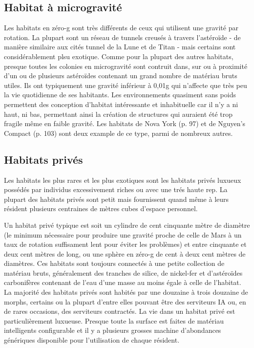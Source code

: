                \subsection{Habitat à microgravité} \label{sec:micr-habit} 

               Les habitats en zéro-g sont très différents de ceux qui utilisent une gravité par rotation. La plupart sont un réseau de tunnels creusés à travers l'astéroïde - de manière similaire aux cités tunnel de la Lune et de Titan - mais certains sont  considérablement plsu exotique. Comme pour la plupart des autres habitats, presque toutes les colonies en microgravité sont contruit dans, sur ou à proximité d'un ou de plusieurs astéroïdes contenant un grand nombre de matériau bruts utiles. Ils ont typiquement une gravité inférieur à 0,01g qui n'affecte que très peu la vie quotidienne de ses habitants. Les environnements quasiment sans poids permettent des conception d'habitat intéressante et inhabituelle car il n'y a ni haut, ni bas, permettant ainsi la création de structures qui auraient été trop fragile même en faible gravité. Les habitats de Nova York (p. 97) et de Nguyen's Compact (p. 103) sont deux example de ce type, parmi de nombreux autres. 

               \subsection{Habitats privés} \label{sec:private-habitats} 

               Les habitats les plus rares et les plus exotiques sont les habitats privés luxueux possédés par individus excessivement riches ou avec une trés haute rep. La plupart des habitats privés sont petit mais fournissent quand même à leurs résident plusieurs centraines de mètres cubes d'espace personnel. 

               Un habitat privé typique est soit un cylindre de cent cinquante mètre de diamètre (le minimum nécessaire pour produire une gravité proche de celle de Mars à un taux de rotation suffisament lent pour éviter les problèmes) et entre cinquante et deux cent mètres de long, ou une sphère en zéro-g de cent à deux cent mètres de diamètres. Ces habitats sont toujours connectés à une petite collection de matériau bruts, généralement des tranches de silice, de nickel-fer et d'astéroïdes carbonifères contenant de l'eau d'une masse au moins égale à celle de l'habitat. La majorité des habitats privés sont habités par une douzaine à trois douzaine de morphs, certains ou la plupart d'entre elles pouvant être des serviteurs IA ou, en de rares occasions, des serviteurs contractés. La vie dans un habitat privé est particulièrement luxueuse. Presque toute la surface est faites de matériau intelligents configurable et il y a plusieurs grosses machine d'abondances génériques disponible pour l'utilisation de chaque résident. 

